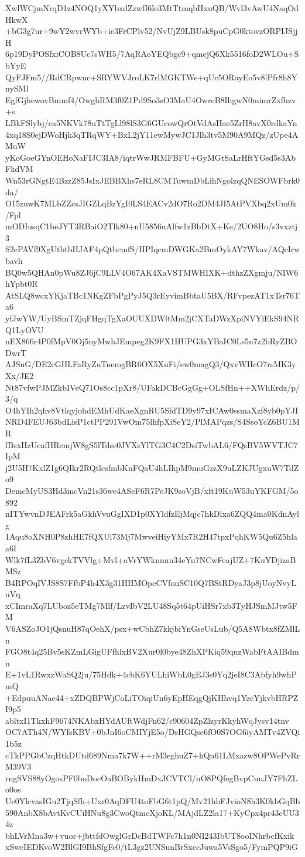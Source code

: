 XwlWCjmNrqD1z4NOQ1yXYbxdZzwfI6le3MtTtmqbHxuQB/Wvl3vAwU4NaqOdHkwX
+bG3g7ur+9wY2wvrWYb+ie3FrCPlv52/NvUjZ9LBUsk8puCpG0ktovzORPIJSjjH
6p19DyPOSfxiCOB8Uc7sWH5/7AqRAoYEQbgc9+qmejQ6Xk5516foD2WLOu+SbYyE
QyFJFm5//RdCRpwuc+SRYWVJroLK7rlMGKTWe+qUc5ORayEo5v8lPfr8h8YnySMl
EgfGjhewovBmmf4/OwgbRM3f0Z1Pd9So3sO3MaU4OwrcB8IhgwN0mimrZxfhzv+s
LBkFSlybj/ca5NKVk78uTtTgLl98lS3G6GUcowQrOtVdAsHae5ZrH8avX0rdkaYn
4xq18S0ejDWoHjk3qTRqWY+BxL2jY11ewMywJC1Jlh3tv5M90A9MQz/zUpe4AMuW
yKoGoeGYnOEHoNaFIJC3IA8/iqtrWwJRMFBFU+GyMGtSaLrHftYGsd5s3AbFkdVM
Wn53rGNgtE4BzzZ85JsIxJEBBXhs7eRL8CMTuwmDbLihNgolzqQNESOWFbrk0da/
O15zuwK7MLbZZcsJIGZLqBzYgI0LS4EACv2dO7Ro2DM4JI5AtPVXbq2xUm0k/Fpl
mODIusqC1beJYT3RBaiO2Tlk80+nU5856uAlfw1zBbDtX+Ke/2UO8Ho/s3vxztj3
S2ePAVf9XgUtbtbHJAF4pQtbcmfS/HPIqcmDWGKa2BmOykAY7Wkav/AQcIrwbavh
BQ0w5QHAn0pWu8ZJ6jC9LLV4O67AK4XaVSTMWHIXK+dthzZXgmju/NIW6hYpbt0R
AtSLQ8wcxYKjaTBc1NKgZFbPgPyJ5Q3rEyvimBbtaU5BX/RFvpezAT1xTsr76Ta6
yfJwYW/UyBSmTZjqFHgqTgXaOUUXDWltMm2jCXTaDWzXpiNVYiEkS94NRQ1LyOVU
nEX866r4P0fMpV0Oj5nyMwhJEmpeg2K9FX1HUPG3xYBaIC0Ls5n7z2bRyZBODwrT
AJSuG/DE2cGHLFaRyZuTnemgBR6OX5XuFi/ew0magQ3/QxvWHcO7rsMK3yXx/JE2
Nt87vfwPJMZkbIVeQ71Os8cc1pXr8/UFakDCBcGgGg+OLSfHn++XWhErdz/p/3/q
O4hYIh2qhv8VtlqyjohdEMhUdKaeXgnRU5SfdTD9y97xICAw0ssmaXzf8yb0pYJI
NRD4FEUJ63bdLisP1ctPP291VwOm75lhfpXiSeY2/PlMAPqzs/S4SsoYcZ6BU1MR
fBsxHzUeafHRemjW8gS5lTdse0JVXsYlTG3C4C2DsiTwbAL6/FQsBV5WVTJC7IpM
j2U5H7KxlZ1g6QIkr2RQtlcsfmbKnFQaU4hLIhpM9muGzzX9uLZKJUgxuW7TdZo9
DemcMyUS3Hd3mcVn21s36we4ASeF6R7PeJK9soVjB/xft19KuW53uYKFGM/5o892
nITYwvnDJEAFrk5aGkhVvuGgIXD1p0XYldfzEjMqjc7hkDlxa6ZQQ4ma0KdnAylg
1Aqu8oXNH0P8zhHE7fQXUl73Mj7MwveiHiyYMx7R2H47tpxPqhKW5Qu6Z5hlaa6I
Wlk7fL3ZbV6vgckTVVlg+Mvl+aVrYWknnnn34eYu7NCwFeajUZ+7KuYDjizaBMSz
B4RPOqIVJS8S7FfbP4h4X3g31HHMOpeCVfonSC10Q7BStRDyaJ3p8jUoyNvyLuVq
xCImraXq7LUboz5eTMg7Mlf/LzvIbV2LU48Sq5t64pUiHSr7xb3TyHJSmMJtw5FM
V6ASZoJO1jQsnuH87qOehX/psx+wCbhZ7kkjbiYnGseUsLub/Q5A8Wbtx8fZMlLn
FGO8t4q25Bv5sKZmLGigUFfhlxBV2Xur0l0bye48ZhXPKiq59qnzWabFtAAIBdmn
E+1vL1RwxzWaSQ2ju/75Hdk+4cbK6YULhiWbL0gEJ3s0Yq2jeI8C3Abfyh9whPmQ
+EdpuuANae44+xZDQBPWjCoLiTOiqiUn6yEpHEqgQjKHhvq1YzeYjkvbHRPZI9p5
abltxI1TkxhF9674NKAbxHYdAUftWdjFn62/c90604ZpZlzyrKkyhWqJysv14tnv
OC7ATh4N/WYfsKBV+0bJnI6oCMIYjE5o/DsHGQse6fO0S7OG6iyAMTv4ZVQi1b5z
cTkPPGbCzqHtkDUtd689Nma7k7W++rM3eghuZ7+hQn61LMxazw8OPWePvRrM39V3
rngSVS88yOgosPF0boDocOaBOBykHmDxJCVTCl/nO8PQfegBvpCuuJY7FhZLo0os
Ue0YlcvasIGu2TjqSfh+Uxr0AqDFU4toFbG6t1pQ/Mv21hhFJvioN8h3K0kbGqBb
590AnbX8bAvtKvCUiHNu8g3CwoQtmcXjoKL/MAjdLZ2la17+KyCpx4pr43eUU34z
bhLVrMna3w+vuor+jbttfdOwglGrDcBdTWFc7h1n0NI243IbUT8ooINhrbcfKxik
xSweIEDKvoW2BlGI9BhSfgFc0/tL3gz2UNSunBrSxccJuwa5VsSgo5/FymPQP9iG
